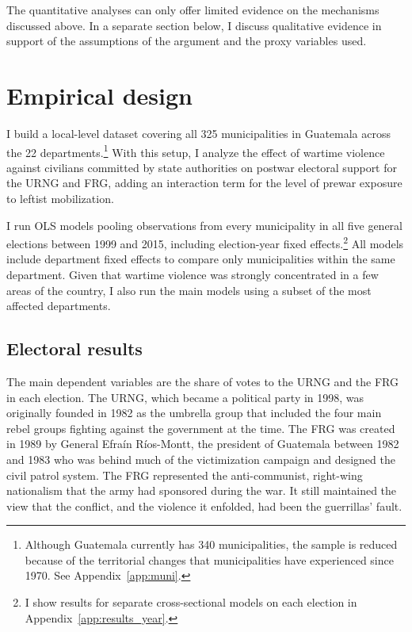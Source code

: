 \documentclass[12pt, notitlepage]{article}
\begin{document}
The quantitative analyses can only offer limited evidence on the mechanisms discussed above.
In a separate section below, I discuss qualitative evidence in support of the assumptions of the argument and the proxy variables used.

\section*{Empirical design}

I build a local-level dataset covering all 325 municipalities in Guatemala across the 22 departments.\footnote{Although Guatemala currently has 340 municipalities, the sample is reduced because of the territorial changes that municipalities have experienced since 1970. See Appendix~\ref{app:muni}.}
With this setup, I analyze the effect of wartime violence against civilians committed by state authorities on postwar electoral support for the URNG and FRG, adding an interaction term for the level of prewar exposure to leftist mobilization.

I run OLS models pooling observations from every municipality in all five general elections between 1999 and 2015, including election-year fixed effects.\footnote{I show results for separate cross-sectional models on each election in Appendix~\ref{app:results_year}.}
All models include department fixed effects to compare only municipalities within the same department.
Given that wartime violence was strongly concentrated in a few areas of the country, I also run the main models using a subset of the most affected departments.

\subsection*{Electoral results}

The main dependent variables are the share of votes to the URNG and the FRG in each election.
The URNG, which became a political party in 1998, was originally founded in 1982 as the umbrella group that included the four main rebel groups fighting against the government at the time.
The FRG was created in 1989 by General Efraín Ríos-Montt, the president of Guatemala between 1982 and 1983 who was behind much of the victimization campaign and designed the civil patrol system.
The FRG represented the anti-communist, right-wing nationalism that the army had sponsored during the war.
It still maintained the view that the conflict, and the violence it enfolded, had been the guerrillas' fault.
\end{document}
